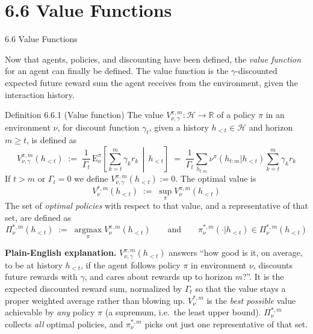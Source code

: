 \documentclass[aspectratio=169,10pt]{beamer}
\newcommand{\Hcal}{\mathcal{H}}
\begin{document}
\section{6.6 Value Functions}

\begin{frame}[allowframebreaks]{6.6 Value Functions}

Now that agents, policies, and discounting have been defined, the
\emph{value function} for an agent can finally be defined. The value
function is the $\gamma$-discounted expected future reward sum the agent
receives from the environment, given the interaction history.

\begin{block}{Definition 6.6.1 (Value function)}
The value $V^{\pi,m}_{\nu,\gamma}: \Hcal \to \mathbb{R}$ of a policy $\pi$
in an environment $\nu$, for discount function $\gamma_t$, given a history
$h_{<t} \in \Hcal$ and horizon $m \ge t$, is defined as
\[
  V^{\pi,m}_{\nu,\gamma}(h_{<t}) \;:=\;
  \frac{1}{\Gamma_t}\,\mathrm{E}^\pi_\nu\!\left[\sum_{k=t}^{m}\gamma_k r_k \,\middle|\, h_{<t}\right]
  \;=\;
  \frac{1}{\Gamma_t}\sum_{h_{t:m}}\nu^\pi(h_{t:m}|h_{<t})\sum_{k=t}^m \gamma_k r_k
\]
If $t>m$ or $\Gamma_t = 0$ we define $V^{\pi,m}_{\nu,\gamma}(h_{<t}) := 0$.
The optimal value is
\[
  V^{*,m}_\nu(h_{<t}) \;:=\; \sup_\pi V^{\pi,m}_\nu(h_{<t})
\]
The set of \emph{optimal policies} with respect to that value, and a
representative of that set, are defined as
\[
  \Pi^{*,m}_\nu(h_{<t}) \;:=\; \operatorname*{argmax}_\pi V^{\pi,m}_\nu(h_{<t})
  \qquad\text{and}\qquad
  \pi^{*,m}_\nu(\cdot|h_{<t}) \in \Pi^{*,m}_\nu(h_{<t})
\]
\end{block}

\textbf{Plain-English explanation.} $V^{\pi,m}_{\nu,\gamma}(h_{<t})$ answers
``how good is it, on average, to be at history $h_{<t}$, if the agent
follows policy $\pi$ in environment $\nu$, discounts future rewards with
$\gamma$, and cares about rewards up to horizon $m$?''. It is the expected
discounted reward sum, normalized by $\Gamma_t$ so that the value stays a
proper weighted average rather than blowing up. $V^{*,m}_\nu$ is the
\emph{best possible} value achievable by \emph{any} policy $\pi$ (a
supremum, i.e.\ the least upper bound). $\Pi^{*,m}_\nu$ collects \emph{all}
optimal policies, and $\pi^{*,m}_\nu$ picks out just one representative of
that set.


\end{frame}
\end{document}
